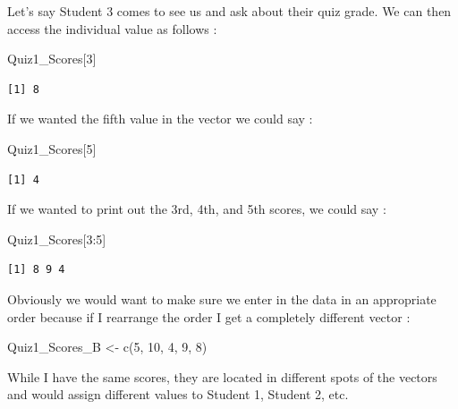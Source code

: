 \documentclass[
  letterpaper,
  DIV=11,
  numbers=noendperiod]{scrreprt}
\newenvironment{Shaded}{\begin{snugshade}}{\end{snugshade}}
\newcommand{\DecValTok}[1]{\textcolor[rgb]{0.68,0.00,0.00}{#1}}
\newcommand{\FunctionTok}[1]{\textcolor[rgb]{0.28,0.35,0.67}{#1}}
\newcommand{\NormalTok}[1]{\textcolor[rgb]{0.00,0.23,0.31}{#1}}
\newcommand{\OtherTok}[1]{\textcolor[rgb]{0.00,0.23,0.31}{#1}}
\newcommand{\SpecialCharTok}[1]{\textcolor[rgb]{0.37,0.37,0.37}{#1}}
\begin{document}
Let's say Student 3 comes to see us and ask about their quiz grade. We
can then access the individual value as follows :

\begin{Shaded}
\begin{Highlighting}[]
\NormalTok{Quiz1\_Scores[}\DecValTok{3}\NormalTok{]}
\end{Highlighting}
\end{Shaded}

\begin{verbatim}
[1] 8
\end{verbatim}

If we wanted the fifth value in the vector we could say :

\begin{Shaded}
\begin{Highlighting}[]
\NormalTok{Quiz1\_Scores[}\DecValTok{5}\NormalTok{]}
\end{Highlighting}
\end{Shaded}

\begin{verbatim}
[1] 4
\end{verbatim}

If we wanted to print out the 3rd, 4th, and 5th scores, we could say :

\begin{Shaded}
\begin{Highlighting}[]
\NormalTok{Quiz1\_Scores[}\DecValTok{3}\SpecialCharTok{:}\DecValTok{5}\NormalTok{]}
\end{Highlighting}
\end{Shaded}

\begin{verbatim}
[1] 8 9 4
\end{verbatim}

Obviously we would want to make sure we enter in the data in an
appropriate order because if I rearrange the order I get a completely
different vector :

\begin{Shaded}
\begin{Highlighting}[]
\NormalTok{Quiz1\_Scores\_B }\OtherTok{\textless{}{-}} \FunctionTok{c}\NormalTok{(}\DecValTok{5}\NormalTok{, }\DecValTok{10}\NormalTok{, }\DecValTok{4}\NormalTok{, }\DecValTok{9}\NormalTok{, }\DecValTok{8}\NormalTok{)}
\end{Highlighting}
\end{Shaded}

While I have the same scores, they are located in different spots of the
vectors and would assign different values to Student 1, Student 2, etc.
\end{document}
